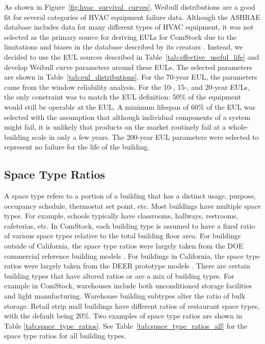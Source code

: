 As shown in Figure~\ref{fig:hvac_survival_curves}, Weibull distributions are a good fit for several categories of HVAC equipment failure data. Although the ASHRAE database includes data for many different types of HVAC equipment, it was not selected as the primary source for deriving EULs for ComStock due to the limitations and biases in the database described by its creators \citep{ashrae_reliability_db_article}.
Instead, we decided to use the EUL sources described in Table~\ref{tab:effective_useful_life} and develop Weibull curve parameters around these EULs. The selected parameters are shown in Table~\ref{tab:eul_distributions}. For the 70-year EUL, the parameters came from the window reliability analysis. For the 10-, 15-, and 20-year EULs, the only constraint was to match the EUL definition: 50\% of the equipment would still be operable at the EUL. A minimum lifespan of 60\% of the EUL was selected with the assumption that although individual components of a system might fail, it is unlikely that products on the market routinely fail at a whole-building scale in only a few years. The 200-year EUL parameters were selected to represent no failure for the life of the building.



\subsection{Space Type Ratios}
\label{sec:space_type_ratios}
A space type refers to a portion of a building that has a distinct usage, purpose, occupancy schedule, thermostat set point, etc. Most buildings have multiple space types. For example, schools typically have classrooms, hallways, restrooms, cafeterias, etc. In ComStock, each building type is assumed to have a fixed ratio of various space types relative to the total building floor area. For buildings outside of California, the space type ratios were largely taken from the DOE commercial reference building models \citep{deru_2011}. For buildings in California, the space type ratios were largely taken from the DEER prototype models \citep{cpuc_deer}. There are certain building types that have altered ratios or are a mix of building types. For example in ComStock, warehouses include both unconditioned storage facilities and light manufacturing. Warehouse building subtypes alter the ratio of bulk storage. Retail strip mall buildings have different ratios of restaurant space types, with the default being 20\%. Two examples of space type ratios are shown in Table \ref{tab:space_type_ratios}. See Table~\ref{tab:space_type_ratios_all} for the space type ratios for all building types.

